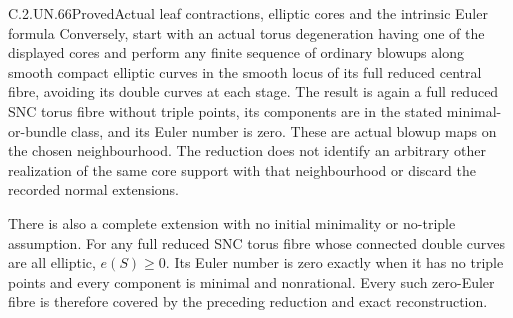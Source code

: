\begin{statement}{C.2.UN.66}{Proved}{Actual leaf contractions, elliptic cores and the intrinsic Euler formula}
Conversely, start with an actual torus degeneration having
one of the displayed cores and perform any finite sequence of
ordinary blowups along smooth compact elliptic curves in the
smooth locus of its full reduced central fibre, avoiding its
double curves at each stage. The result is again a full
reduced SNC torus fibre without triple points, its components
are in the stated minimal-or-bundle class, and its Euler
number is zero. These are actual blowup maps on the chosen
neighbourhood. The reduction does not identify an arbitrary
other realization of the same core support with that
neighbourhood or discard the recorded normal extensions.

There is also a complete extension with no initial minimality
or no-triple assumption. For any full reduced SNC torus fibre
whose connected double curves are all elliptic, $e(S)\ge0$.
Its Euler number is zero exactly when it has no triple
points and every component is minimal and nonrational.
Every such zero-Euler fibre is therefore covered by the
preceding reduction and exact reconstruction.
\end{statement}

